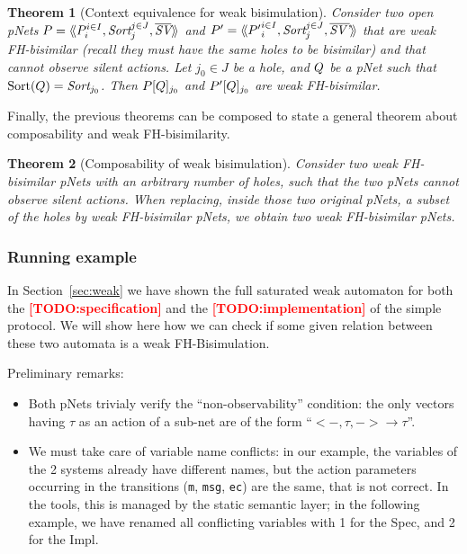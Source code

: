 \documentclass{lmcs}
\newcommand{\TODO}[1]{\textcolor{red}{\textbf{[TODO:#1]}}}
\newtheorem{theorem}{Theorem}
\begin{document}
\begin{theorem}[Context equivalence for  weak bisimulation]\label{weak-thm-ctxt-eq}
	Consider two  open pNets
	$\pNet = \mylangle \pNet_i^{i\in I}, \Sort_j^{j\in J}, 
	\set{\symb{SV}}\myrangle$ and 	$\pNet' = \mylangle {\pNet'}_i^{i\in I}, 
	\Sort_j^{j\in 
	J}, 	\set{\symb{SV'}}\myrangle$ that are weak FH-bisimilar
	(recall they must have the same holes to be bisimilar) and that cannot observe silent actions.
	Let $j_0\in J$ be a hole, and $Q$ be a pNet such that $\Sortop(\pNetQ)=\Sort_{j_0}$. Then 
	$P[Q]_{j_0}$ and 
	$P'[Q]_{j_0}$ are weak FH-bisimilar.
\end{theorem}

Finally, the previous theorems can be composed to state a general theorem about 
composability and weak FH-bisimilarity.

\begin{theorem}[Composability of weak bisimulation]\label{weak-compos}
	Consider two weak FH-bisimilar pNets with an arbitrary number of holes, such that the two pNets cannot observe silent actions. When replacing, 
	inside those two original pNets, a subset of the holes by weak FH-bisimilar pNets, we 
	obtain two weak FH-bisimilar pNets.
\end{theorem}


\subsubsection*{Running example}
\label{subsubsection:runnig example}
In Section~\ref{sec:weak} we have shown the full saturated weak automaton for both the \TODO{specification} and the \TODO{implementation} of the simple protocol. We will show here how we can check if some given relation between these two automata is a weak FH-Bisimulation. 

\medskip
\noindent
Preliminary remarks:
  \begin{itemize}
    \item Both pNets trivialy verify the ``non-observability''
      condition: the only vectors having $\tau$ as an action of a
      sub-net are of the form ``$< -, \tau, -> \rightarrow \tau$''.
    \item We must take care of variable name conflicts: in our example, the variables of the 2 systems already have different names, but the action parameters occurring in the transitions (\texttt{m}, \texttt{msg}, \texttt{ec}) are the same, that is not correct. In the tools, this is managed by the static semantic layer; in the following example, we have renamed all conflicting variables with 1 for the Spec, and 2 for the Impl.
    \end{itemize}
\end{document}
